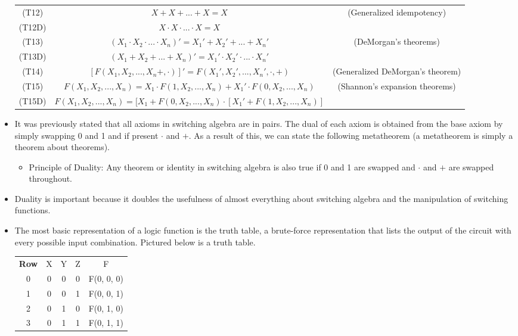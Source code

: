 \documentclass[10pt,a4paper]{article}
\begin{document}
\begin{itemize}
\hspace*{-3.5cm}\begin{tabular}{|ccc|}
\hline 
(T12) & $X+X+...+X=X$ & (Generalized idempotency) \\ 
(T12D) & $X\cdot X\cdot ... \cdot X=X$ &  \\ 
(T13) & $(X_1\cdot X_2\cdot ... \cdot X_n)'=X_1'+X_2'+...+X_n'$ & (DeMorgan's theorems) \\ 
(T13D) & $(X_1+X_2+...+X_n)'=X_1'\cdot X_2'\cdot ... \cdot X_n'$ &  \\ 
(T14) & $[F(X_1,X_2, ..., X_n+,\cdot)]'=F(X_1', X_2', ..., X_n', \cdot, +)$ & (Generalized DeMorgan's theorem) \\ 
(T15) & $F(X_1, X_2, ..., X_n)=X_1\cdot F(1, X_2, ..., X_n)+X_1'\cdot F(0, X_2, ..., X_n)$ & (Shannon's expansion theorems) \\ 
(T15D) & $F(X_1, X_2, ..., X_n)=[X_1+F(0, X_2, ..., X_n)\cdot[X_1'+F(1, X_2, ..., X_n)]$ &  \\ 
\hline 
\end{tabular} 
\item It was previously stated that all axioms in switching algebra are in pairs. The dual of each axiom is obtained from the base axiom by simply swapping 0 and 1 and if present $\cdot$ and $+$. As a result of this, we can state the following metatheorem (a metatheorem is simply a theorem about theorems).
\begin{itemize}
\item Principle of Duality: Any theorem or identity in switching algebra is also true if 0 and 1 are swapped and $\cdot$ and $+$ are swapped throughout. 
\end{itemize}
\item Duality is important because it doubles the usefulness of almost everything about switching algebra and the manipulation of switching functions. 
\item The most basic representation of a logic function is the truth table, a brute-force representation that lists the output of the circuit with every possible input combination. Pictured below is a truth table.\\
\begin{tabular}{|ccccc|}
\hline 
\textbf{Row} & X & Y & Z & F \\ 
0 & 0 & 0 & 0 & F(0, 0, 0) \\ 
1 & 0 & 0 & 1 & F(0, 0, 1) \\ 
2 & 0 & 1 & 0 & F(0, 1, 0) \\ 
3 & 0 & 1 & 1 & F(0, 1, 1) \\ 

\end{tabular}
\end{itemize}
\end{document}
